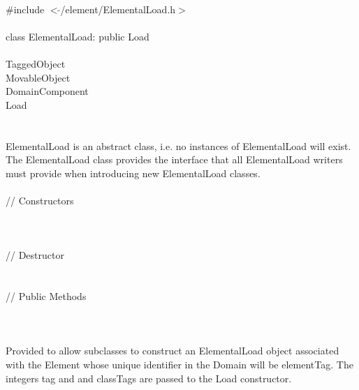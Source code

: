 
   \\
\indent \#include $<\tilde{ }$/element/ElementalLoad.h$>$  \\

  \\
\indent class ElementalLoad: public Load \\

 \\
\indent TaggedObject \\
\indent MovableObject \\
\indent\indent DomainComponent \\
\indent\indent\indent Load \\
\indent\indent\indent{} \\

  \\
\indent ElementalLoad is an abstract class, i.e. no instances of
ElementalLoad will exist. The ElementalLoad class provides the
interface that all ElementalLoad writers must provide when
introducing new ElementalLoad classes. \\ 

 \\
\indent\indent // Constructors \\
\indent{}  \\ 
\indent{}  \\ \\
\indent\indent // Destructor \\
\indent{}\\ \\
\indent\indent // Public Methods  \\
\indent{} \\



  \\
  \\
Provided to allow subclasses to construct an ElementalLoad object
associated with the Element whose unique identifier in the Domain will
be \p elementTag. The integers \p tag and and \p classTags
are passed to the Load constructor. \\ 

